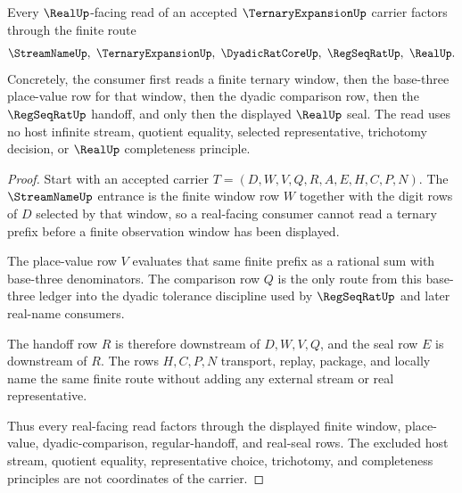 \begin{theorem}\label{thm:ternary-expansion-regseqrat-readback}
Every $\RealUp$-facing read of an accepted $\TernaryExpansionUp$ carrier factors through the finite route
$$
\StreamNameUp,\ \TernaryExpansionUp,\ \DyadicRatCoreUp,\ \RegSeqRatUp,\ \RealUp .
$$
Concretely, the consumer first reads a finite ternary window, then the base-three place-value row for that window, then the dyadic comparison row, then the $\RegSeqRatUp$ handoff, and only then the displayed $\RealUp$ seal. The read uses no host infinite stream, quotient equality, selected representative, trichotomy decision, or $\RealUp$ completeness principle.
\end{theorem}
\begin{proof}
Start with an accepted carrier $T=(D,W,V,Q,R,A,E,H,C,P,N)$. The $\StreamNameUp$ entrance is the finite window row $W$ together with the digit rows of $D$ selected by that window, so a real-facing consumer cannot read a ternary prefix before a finite observation window has been displayed.

The place-value row $V$ evaluates that same finite prefix as a rational sum with base-three denominators. The comparison row $Q$ is the only route from this base-three ledger into the dyadic tolerance discipline used by $\RegSeqRatUp$ and later real-name consumers.

The handoff row $R$ is therefore downstream of $D,W,V,Q$, and the seal row $E$ is downstream of $R$. The rows $H,C,P,N$ transport, replay, package, and locally name the same finite route without adding any external stream or real representative.

Thus every real-facing read factors through the displayed finite window, place-value, dyadic-comparison, regular-handoff, and real-seal rows. The excluded host stream, quotient equality, representative choice, trichotomy, and completeness principles are not coordinates of the carrier.
\end{proof}

